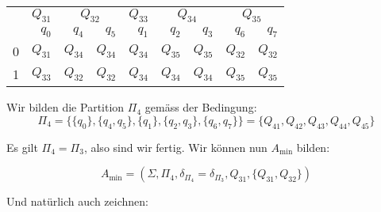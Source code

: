 \documentclass[11pt]{article} %
\theoremstyle{definition}
\begin{document}
\begin{center}
\begin{tabular}{r|r|rr|r|rr|rr}
\toprule
      & \multicolumn{1}{c}{$Q_{31}$} & \multicolumn{2}{c}{$Q_{32}$} & \multicolumn{1}{c}{$Q_{33}$}& \multicolumn{2}{c}{$Q_{34}$}& \multicolumn{2}{c}{$Q_{35}$} \\
      & $q_0$ & $q_4$ & $q_5$ & $q_1$ & $q_2$ & $q_3$ & $q_6$ & $q_7$ \\
\midrule
0     & $Q_{31}$ & $Q_{34}$ & $Q_{34}$ & $Q_{34}$ & $Q_{35}$ & $Q_{35}$ & $Q_{32}$ & $Q_{32}$ \\
1     & $Q_{33}$ & $Q_{32}$ & $Q_{32}$ & $Q_{34}$ & $Q_{34}$ & $Q_{34}$ & $Q_{35}$ & $Q_{35}$ \\
\bottomrule
\end{tabular}%
\end{center}

Wir bilden die Partition $\Pi_4$ gemäss der Bedingung:
\[
\Pi_4 = \{\{q_0\}, \{ q_4,q_5\}, \{q_1\}, \{q_2, q_3\}, \{q_6, q_7\}\} = \{ Q_{41}, Q_{42}, Q_{43}, Q_{44}, Q_{45} \}
\]

Es gilt $\Pi_4 = \Pi_3$, also sind wir fertig. Wir können nun $A_\textrm{min}$ bilden:

\[
A_\textrm{min} = (\Sigma, \Pi_4, \delta_{\Pi_4} = \delta_{\Pi_3}, Q_{31}, \{ Q_{31}, Q_{32} \})
\]

Und natürlich auch zeichnen:
\end{document}
